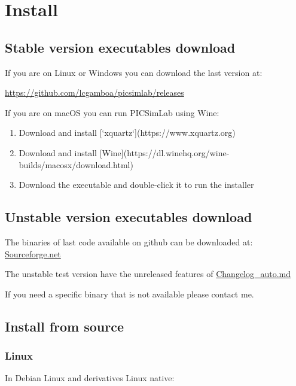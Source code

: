 \chapter{Install}

\section{Stable version executables download} 

If you are on Linux or Windows you can download the last version at:

\href{https://github.com/lcgamboa/picsimlab/releases}{https://github.com/lcgamboa/picsimlab/releases}

If you are on macOS you can run PICSimLab using Wine:

\begin{enumerate}
 \item  Download and install [`xquartz`](https://www.xquartz.org)
 \item  Download and install [Wine](https://dl.winehq.org/wine-builds/macosx/download.html)
 \item  Download the executable and double-click it to run the installer
\end{enumerate}

\section{Unstable version executables download}

The binaries of last code available on github can be downloaded at: \href{https://sourceforge.net/projects/picsim/files/latest\%20code\%20build\%20\%28unstable\%29/}{Sourceforge.net}
 
The unstable test version have the unreleased features of \href{https://github.com/lcgamboa/picsimlab/blob/master/CHANGELOG_auto.md}{Changelog\_auto.md}

If you need a specific binary that is not available please contact me. 

\section{Install from source}

\subsection{Linux}

 In Debian Linux and derivatives Linux native:

